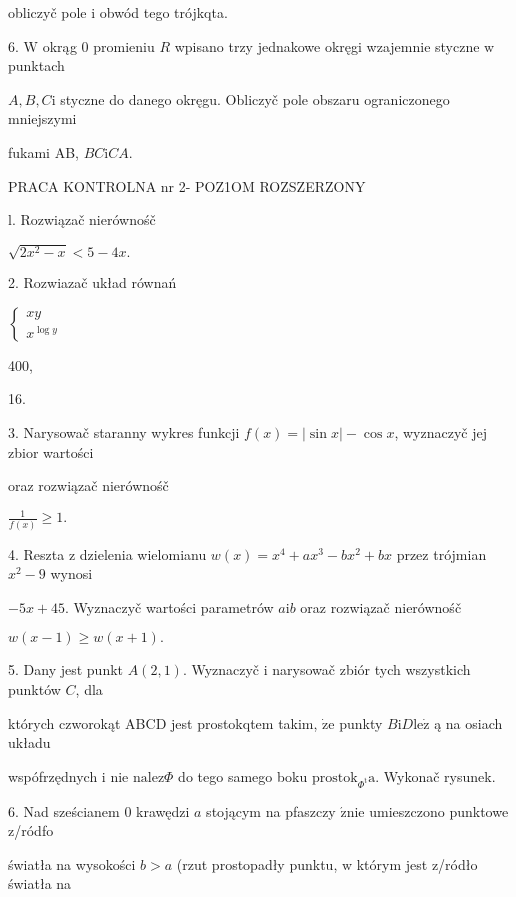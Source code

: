 \documentclass[a4paper,12pt]{article}
\begin{document}
obliczyč pole $\mathrm{i}$ obwód tego trójkqta.

6. $\mathrm{W}$ okrąg $0$ promieniu $R$ wpisano trzy jednakowe okręgi wzajemnie styczne $\mathrm{w}$ punktach

$A, B, C\mathrm{i}$ styczne do danego okręgu. Obliczyč pole obszaru ograniczonego mniejszymi

fukami AB, $BC\mathrm{i}CA.$




PRACA KONTROLNA nr 2- POZ1OM ROZSZERZONY

l. Rozwiązač nierównośč

$\sqrt{2x^{2}-x}<5-4x.$

2. Rozwiazač układ równań

$\left\{\begin{array}{l}
xy\\
x^{\log y}
\end{array}\right.$

400,

16.

3. Narysowač staranny wykres funkcji $f(x)=|\sin x|-\cos x$, wyznaczyč jej zbior wartości

oraz rozwiązač nierównośč

$\displaystyle \frac{1}{f(x)}\geq 1.$

4. Reszta $\mathrm{z}$ dzielenia wielomianu $w(x)=x^{4}+ax^{3}-bx^{2}+bx$ przez trójmian $x^{2}-9$ wynosi

$-5x+45$. Wyznaczyč wartości parametrów $a\mathrm{i}b$ oraz rozwiązač nierównośč

$w(x-1)\geq w(x+1).$

5. Dany jest punkt $A(2,1)$. Wyznaczyč $\mathrm{i}$ narysowač zbiór tych wszystkich punktów $C$, dla

których czworokąt ABCD jest prostokqtem takim, $\dot{\mathrm{z}}\mathrm{e}$ punkty $B\mathrm{i}D\mathrm{l}\mathrm{e}\dot{\mathrm{z}}$ ą na osiach układu

wspófrzędnych $\mathrm{i}$ nie $\mathrm{n}\mathrm{a}\mathrm{l}\mathrm{e}\mathrm{z}\Phi$ do tego samego boku $\mathrm{p}\mathrm{r}\mathrm{o}\mathrm{s}\mathrm{t}\mathrm{o}\mathrm{k}_{\Phi^{\mathrm{t}}}\mathrm{a}$. Wykonač rysunek.

6. Nad sześcianem $0$ krawędzi $a$ stojącym na pfaszczy $\acute{\mathrm{z}}\mathrm{n}\mathrm{i}\mathrm{e}$ umieszczono punktowe z/ródfo

światła na wysokości $b>a$ (rzut prostopadły punktu, $\mathrm{w}$ którym jest z/ródło światła na
\end{document}
